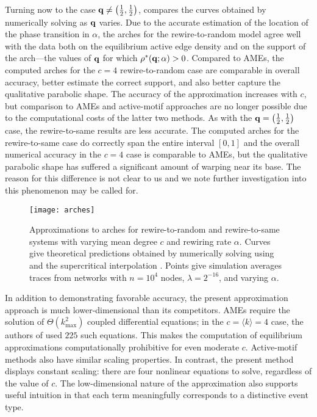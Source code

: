 \documentclass[review, onefignum, onetabnum]{siamart171218}
\begin{document}
		Turning now to the case $\mathbf{q} \neq \left(\frac{1}{2}, \frac{1}{2}\right)$,  compares the curves obtained by numerically solving  as $\mathbf{q}$ varies. 
		Due to the accurate estimation of the location of the phase transition in $\alpha$, the arches for the rewire-to-random model agree well with the data both on the equilibrium active edge density and on the support of the arch---the values of $\mathbf{q}$ for which $\rho^*(\mathbf{q};\alpha) > 0$. 
		Compared to AMEs, the computed arches for the $c = 4$ rewire-to-random case are comparable in overall accuracy, better estimate the correct support, and also better capture the qualitative parabolic shape.  
		The accuracy of the approximation increases with $c$, but comparison to AMEs and active-motif approaches are no longer possible due to the computational costs of the latter two methods. 
		As with the $\mathbf{q} = \left(\frac{1}{2}, \frac{1}{2}\right)$ case, the rewire-to-same results are less accurate. 
		The computed arches for the rewire-to-same case do correctly span the entire interval $[0,1]$ and 
		the overall numerical accuracy in the $c = 4$ case is comparable to AMEs, but the qualitative parabolic shape has suffered a significant amount of warping near its base. 
		The reason for this difference is not clear to us and we note further investigation into this phenomenon may be called for. 

		\begin{figure}
			\centering
				\texttt{[image: arches]}
			\caption{Approximations to arches for rewire-to-random and rewire-to-same systems with varying mean degree $c$ and rewiring rate $\alpha$. 
			Curves give theoretical predictions obtained by numerically solving  using  and the supercritical interpolation . 
			Points give simulation averages traces from networks with $n = 10^4$ nodes,  $\lambda = 2^{-16}$, and varying $\alpha$.}
			\label{fig:arches}
		\end{figure}

		In addition to demonstrating favorable accuracy, the present approximation approach is much lower-dimensional than its competitors. 
		AMEs require the solution of $\Theta\left(k_\mathrm{max}^2\right)$ coupled differential equations; in the $c = \langle k\rangle = 4$ case, the authors of \cite{Durrett2012} used $225$ such equations. 
		This makes the computation of equilibrium approximations computationally prohibitive for even moderate $c$. 
		Active-motif methods also have similar scaling properties. 
		In contrast, the present method displays constant scaling: there are four nonlinear equations to solve, regardless of the value of $c$. 
		The low-dimensional nature of the approximation also supports useful intuition in that each term meaningfully corresponds to a distinctive event type.
\end{document}
